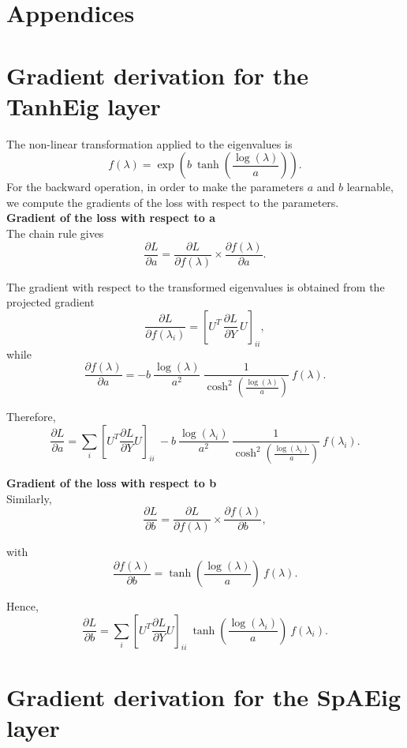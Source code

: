 \documentclass[11pt,a4paper]{article}
\begin{document}
\newpage
\printbibliography

\newpage
\appendix
\section*{Appendices}
\section{Gradient derivation for the TanhEig layer}
\label{app:tanheig}

The non-linear transformation applied to the eigenvalues is  \[ f(\lambda) =\exp( b \: \tanh(\frac{\log(\lambda)}{a})).\]
For the backward operation, in order to make the parameters $a$ and $b$ learnable, we compute the gradients of the loss with respect to the parameters. \\

\noindent \textbf{Gradient of the loss with respect to a } \\
The chain rule gives 
\[ \frac{\partial L}{\partial a} = \frac{\partial L}{\partial f(\lambda)}  \times \frac{\partial f(\lambda)}{\partial a}.\]

\noindent The gradient with respect to the transformed eigenvalues is obtained from the projected gradient \[\frac{\partial L}{\partial f(\lambda_i)}=  [U^T\, \frac{\partial L}{\partial Y}\,U]_{ii}, \] while \[\frac{\partial f(\lambda)}{\partial a} = -b \: \frac{\log(\lambda)}{a^2} \: \frac{1}{\cosh^2(\frac{\log(\lambda)}{a})} \: f(\lambda).\]

\noindent Therefore, 
\[ \frac{\partial L}{\partial a} =  \sum_i [U^T \frac{\partial L}{\partial Y} U]_{ii}\: -b \: \frac{\log(\lambda_i)}{a^2} \: \frac{1}{\cosh^2(\frac{\log(\lambda_i)}{a})} \: f(\lambda_i). \]

\noindent \textbf{Gradient of the loss with respect to b } \\
Similarly, 
\[ \frac{\partial L}{\partial b} = \frac{\partial L}{\partial f(\lambda)}  \times \frac{\partial f(\lambda)}{\partial b},\]

\noindent with \[\frac{\partial f(\lambda)}{\partial b}= \tanh(\frac{\log(\lambda)}{a}) \: f(\lambda).\]

\noindent Hence, 
\[ \frac{\partial L}{\partial b} =  \sum_i [U^T \frac{\partial L}{\partial Y}U]_{ii} \: \tanh(\frac{\log(\lambda_i)}{a}) \: f(\lambda_i).\]

\newpage

\section{Gradient derivation for the SpAEig layer}
\label{app:spaeig}
\end{document}
